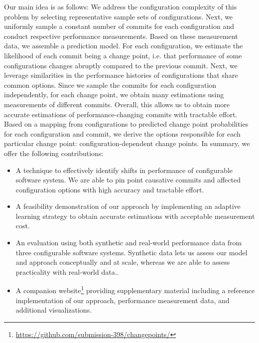 \documentclass[sigconf]{acmart}
\begin{document}
	Our main idea is as follows: We address the configuration complexity of this problem by selecting representative sample sets of configurations.
	Next, we uniformly sample a constant number of commits for each configuration and conduct respective performance measurements.
	Based on these measurement data, we assemble a prediction model.
	For each configuration, we estimate the likelihood of each commit being a change point, i.e. that performance of some configurations changes abruptly compared to the previous commit.
	Next, we leverage similarities in the performance histories of configurations that share common options.
	Since we sample the commits for each configuration independently, for each change point, we obtain many estimations using measurements of different commits.
	Overall, this allows us to obtain more accurate estimations of performance-changing commits with tractable effort.
	Based on a mapping from configurations to predicted change point probabilities for each configuration and commit, we derive the options responsible for each particular change point: configuration-dependent change points.
	In summary, we offer the following contributions:
	\begin{itemize}
		\item A technique to effectively identify shifts in performance of configurable software system. We are able to pin point causative commits and affected configuration options with high accuracy and tractable effort.
		\item A feasibility demonstration of our approach by implementing an adaptive learning strategy to obtain accurate estimations with acceptable measurement cost.
		\item An evaluation using both synthetic and real-world performance data from three configurable software systems. Synthetic data lets us assess our model and approach conceptually and at scale, whereas we are able to assess practicality with real-world data..
		\item A companion website\footnote{\url{https://github.com/submission-398/changepoints/}} providing supplementary material including a reference implementation of our approach, performance measurement data, and additional visualizations.
	\end{itemize}
\end{document}
